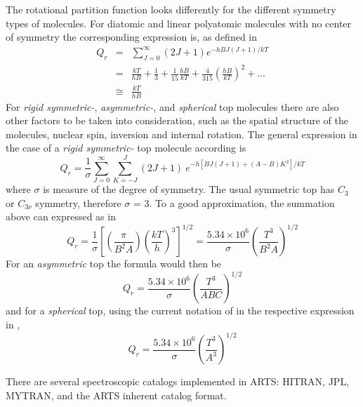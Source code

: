 The rotational partition function looks differently for the different
symmetry types of molecules.
For diatomic and linear  polyatomic molecules with no center of
symmetry the corresponding expression is, as defined in \citet{gordyandcook:70}
\begin{eqnarray}\label{rot_partition}
Q_r & = & \sum_{J=0}^\infty (2J+1)e^{-hBJ(J+1)/kT}\nonumber\\
   & = & \frac{kT}{hB}+\frac{1}{3}+\frac{1}{15}\frac{hB}{kT}+\frac{4}{315}\left(\frac{hB}{kT}\right)^2+...\nonumber\\
   & \cong & \frac{kT}{hB}
\end{eqnarray}
For {\it{ rigid symmetric-}}, {\it{asymmetric-}}, and {\it{spherical}} top molecules there are also
other factors to be taken into consideration, such as the
spatial structure of the molecules, nuclear spin, inversion and
internal rotation. The general expression in the case of a 
{\it{ rigid symmetric-}} top molecule according \citet{herzberg:45}
is
\begin{equation}\label{rot_partition_symtop}
Q_r  =  \frac{1}{\sigma}\sum_{J=0}^\infty \sum_{K=-J}^{J}(2J+1)~e^{-h[BJ(J+1)+(A-B)K^2]/kT}
\end{equation}
where $\sigma$ is measure of the degree of symmetry. The usual
symmetric top has $C_3$ or $C_{3\nu}$ symmetry, therefore $\sigma$ = 3. To a good
approximation, the summation above can expressed as in \citet{gordyandcook:70}
\begin{equation}\label{rot_partition_top_appro}
Q_r  = 
\frac{1}{\sigma}\left[\left(\frac{\pi}{B^2A}\right)\left(\frac{kT}{h}\right)^3\right]^{1/2}=
\frac{5.34\times 10^6}{\sigma}\left(\frac{T^3}{B^{2}A}\right)^{1/2}
\end{equation}
For an  {\it{asymmetric}} top the formula would then be 
\begin{equation}\label{rot_partition_asymtop}
Q_r = \frac{5.34\times 10^6}{\sigma}\left(\frac{T^3}{ABC}\right)^{1/2}
\end{equation}
and for a {\it{spherical}} top, using the current notation of
\citet{gordyandcook:70} in the respective expression in \citet{herzberg:45},
\begin{equation}\label{rot_partition_sphetop}
Q_r = \frac{5.34\times 10^6}{\sigma}\left(\frac{T^3}{A^3}\right)^{1/2}
\end{equation}








 There are several spectroscopic catalogs
implemented in ARTS: HITRAN, JPL, MYTRAN, and the ARTS inherent
catalog format.

